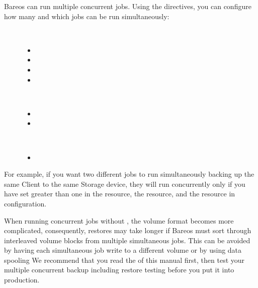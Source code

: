 Bareos can run multiple concurrent jobs. Using the  directives, you
can configure how many and which jobs can be run simultaneously:
\begin{description}
  \item[\bareosDir] \hfill\\
    \begin{itemize}
    \item {}
    \item {}
    \item {}
    \item {}
    \end{itemize}
  \item[\bareosSd] \hfill\\
    \begin{itemize}
    \item {}
    \item {}
    \end{itemize}
  \item[\bareosFd] \hfill\\
    \begin{itemize}
    \item {}
    \end{itemize}
\end{description}

For example, if you want two different jobs to run simultaneously backing up
the same Client to the same Storage device, they will run concurrently only if
you have set  greater than one in the 
resource, the  resource, and the  resource in \bareosDir configuration.

\label{sec:Interleaving}
When running concurrent jobs without , the volume format becomes more complicated,
consequently, restores may take longer if Bareos must sort through interleaved volume blocks from  multiple simultaneous
jobs. This can be avoided by having each simultaneous job write to
a different volume or by using data spooling
We recommend that you read the  of this manual first, then test your multiple
concurrent backup including restore testing before you put it into production.

